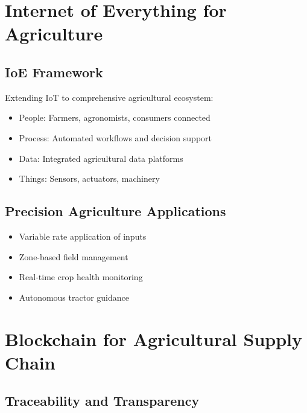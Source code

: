\documentclass[12pt,a4paper]{article}
\begin{document}
\section{Internet of Everything for Agriculture}

\subsection{IoE Framework}

Extending IoT to comprehensive agricultural ecosystem:
\begin{itemize}
    \item People: Farmers, agronomists, consumers connected
    \item Process: Automated workflows and decision support
    \item Data: Integrated agricultural data platforms
    \item Things: Sensors, actuators, machinery
\end{itemize}

\subsection{Precision Agriculture Applications}

\begin{itemize}
    \item Variable rate application of inputs
    \item Zone-based field management
    \item Real-time crop health monitoring
    \item Autonomous tractor guidance
\end{itemize}

\section{Blockchain for Agricultural Supply Chain}

\subsection{Traceability and Transparency}
\end{document}
